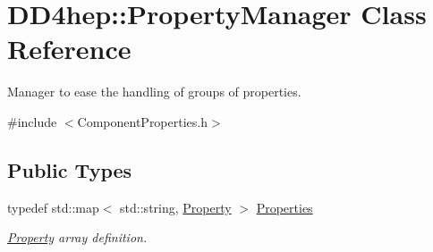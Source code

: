 \hypertarget{class_d_d4hep_1_1_property_manager}{}\section{D\+D4hep\+:\+:Property\+Manager Class Reference}
\label{class_d_d4hep_1_1_property_manager}


Manager to ease the handling of groups of properties.  




{\ttfamily \#include $<$Component\+Properties.\+h$>$}

\subsection*{Public Types}
\begin{DoxyCompactItemize}
\item 
typedef std\+::map$<$ std\+::string, \hyperlink{class_d_d4hep_1_1_property}{Property} $>$ \hyperlink{class_d_d4hep_1_1_property_manager_af9bc1c909d5489219e0f9e97b16dab6f}{Properties}
\begin{DoxyCompactList}\small\item\em \hyperlink{class_d_d4hep_1_1_property}{Property} array definition. \end{DoxyCompactList}\end{DoxyCompactItemize}
